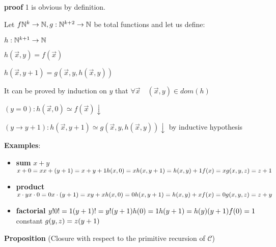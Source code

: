 \textbf{proof}
1 is obvious by definition.

Let $f\mathbb{N}^k\rightarrow\mathbb{N}, g:\mathbb{N}^{k+2}\rightarrow\mathbb{N}$ be total functions and let us define:

$h: \mathbb{N}^{k+1} \rightarrow \mathbb{N}$

$h(\vec{x},y) = f(\vec{x})$

$h(\vec{x},y+1) = g(\vec{x},y,h(\vec{x},y))$

It can be proved by induction on $y$ that $\forall \vec{x} \quad (\vec{x},y) \in dom(h)$

$(y=0): h(\vec{x},0) \simeq f(\vec{x})\downarrow$

$(y\rightarrow y+1): h(\vec{x},y+1) \simeq g(\vec{x},y,h(\vec{x},y))\downarrow$ by inductive hypothesis

\textbf{Examples}:

\begin{itemize}
\item \textbf{sum} $x+y$\\
  $x+0 = x\\
  x+(y+1) = x+y+1\\\\
  h(x,0) = x\\
  h(x,y+1) = h(x,y)+1\\\\
  f(x) = x\\
  g(x,y,z) = z+1$
\item \textbf{product}
  $x\cdot y\\
  x\cdot 0 = 0\\
  x\cdot (y+1) = xy+x\\
  \\
  h(x,0) = 0\\
  h(x,y+1) = h(x,y)+x\\
  \\
  f(x) = 0\\
  g(x,y,z) = z+y$
\item \textbf{factorial}
  $y!\\
  0! = 1\\
  (y+1)! = y!(y+1)\\
  \\
  h(0) = 1\\
  h(y+1) = h(y)(y+1)\\
  \\
  f(0) = 1$ constant $\\
  g(y,z) = z(y+1)$
\end{itemize}

\textbf{Proposition} (Closure with 	respect to the primitive recursion of $\mathcal{C}$)

